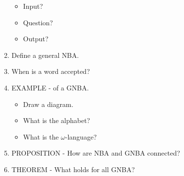 \documentclass[fleqn]{article}
\begin{document}
\begin{enumerate}
    \begin{itemize}
        \item Input?
        \item Question?
        \item Output?
    \end{itemize}
    \item Define a general NBA.
    \item When is a word accepted?
    \item EXAMPLE - of a GNBA.
    \begin{itemize}
        \item Draw a diagram.
        \item What is the alphabet?
        \item What is the $\omega$-language?
    \end{itemize}
    \item PROPOSITION - How are NBA and GNBA connected? 
    \item THEOREM - What holds for all GNBA?
\end{enumerate}
\end{document}
